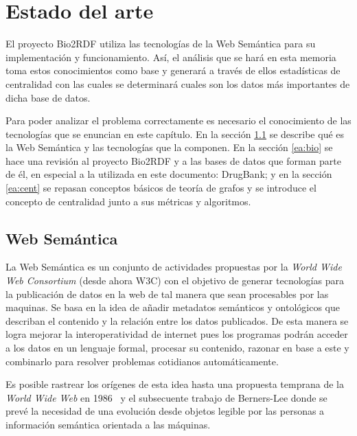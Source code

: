 
\chapter{Estado del arte}
El proyecto Bio2RDF utiliza las tecnologías de la Web Semántica para su
implementación y funcionamiento. Así, el análisis que se hará en esta memoria
toma estos conocimientos como base y generará a través de ellos estadísticas de
centralidad con las cuales se determinará cuales son los datos más importantes
de dicha base de datos.

Para poder analizar el problema correctamente es necesario el conocimiento de
las tecnologías que se enuncian en este capítulo. En la sección \ref{ea:ws} se
describe qué es la Web Semántica y las tecnologías que la componen.
En la sección \ref{ea:bio} se hace una revisión al proyecto Bio2RDF y a las
bases de datos que forman parte de él, en especial a la utilizada en este
documento: DrugBank; y en la sección \ref{ea:cent} se repasan conceptos básicos
de teoría de grafos y se introduce el concepto de centralidad junto a sus
métricas y algoritmos.

\section{Web Semántica}\label{ea:ws}
La Web Semántica es un conjunto de actividades propuestas por la \emph{World
Wide Web Consortium} (desde ahora W3C) con el objetivo de generar tecnologías
para la publicación de datos en la web de tal manera que sean procesables por
las maquinas. 
Se basa en la idea de añadir metadatos semánticos y ontológicos que describan el
contenido y la relación entre los datos publicados. De esta manera se logra
mejorar la interoperatividad de internet pues los programas podrán acceder a los
datos en un lenguaje formal, procesar su contenido, razonar en base a este y
combinarlo para resolver problemas cotidianos automáticamente.

Es posible rastrear los orígenes de esta idea hasta una propuesta temprana de la
\emph{World Wide Web} en 1986~\cite{berners1989proposal} y el subsecuente
trabajo de Berners-Lee \etal\cite{berners1992world} donde se prevé la
necesidad de una evolución desde objetos legible por las personas a información
semántica orientada a las máquinas.

